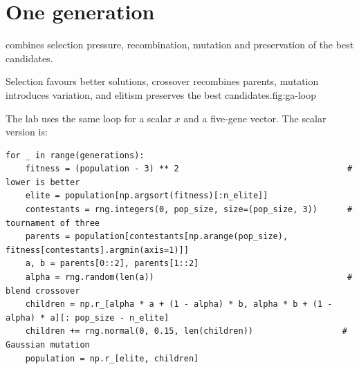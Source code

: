 \section{One generation}

 combines selection pressure, recombination, mutation and preservation of the best candidates.

\begin{aifig}{Selection favours better solutions, crossover recombines parents, mutation introduces variation, and elitism preserves the best candidates.}{fig:ga-loop}
\end{aifig}

The lab uses the same loop for a scalar $x$ and a five-gene vector. The scalar version is:

\begin{lstlisting}[style=aipython]
for _ in range(generations):
    fitness = (population - 3) ** 2                                  # lower is better
    elite = population[np.argsort(fitness)[:n_elite]]
    contestants = rng.integers(0, pop_size, size=(pop_size, 3))      # tournament of three
    parents = population[contestants[np.arange(pop_size), fitness[contestants].argmin(axis=1)]]
    a, b = parents[0::2], parents[1::2]
    alpha = rng.random(len(a))                                       # blend crossover
    children = np.r_[alpha * a + (1 - alpha) * b, alpha * b + (1 - alpha) * a][: pop_size - n_elite]
    children += rng.normal(0, 0.15, len(children))                  # Gaussian mutation
    population = np.r_[elite, children]
\end{lstlisting}

